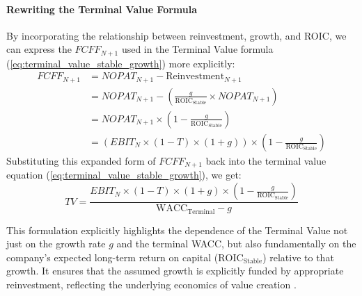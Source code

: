\paragraph{Rewriting the Terminal Value Formula}
By incorporating the relationship between reinvestment, growth, and ROIC, we can express the \(FCFF_{N+1}\) used in the Terminal Value formula (\ref{eq:terminal_value_stable_growth}) more explicitly:
\begin{align*}
    FCFF_{N+1} & = NOPAT_{N+1} - \text{Reinvestment}_{N+1}                                                                         \\
               & = NOPAT_{N+1} - \left( \frac{g}{\text{ROIC}_{\text{Stable}}} \times NOPAT_{N+1} \right)                           \\
               & = NOPAT_{N+1} \times \left( 1 - \frac{g}{\text{ROIC}_{\text{Stable}}} \right)                                     \\
               & = \left( EBIT_N \times (1-T) \times (1+g) \right) \times \left( 1 - \frac{g}{\text{ROIC}_{\text{Stable}}} \right)
\end{align*}
Substituting this expanded form of \(FCFF_{N+1}\) back into the terminal value equation (\ref{eq:terminal_value_stable_growth}), we get:
\begin{equation} \label{eq:terminal_value_expanded}
    TV = \frac{EBIT_N \times (1-T) \times (1+g) \times \left( 1 - \frac{g}{\text{ROIC}_{\text{Stable}}} \right)}{\text{WACC}_{\text{Terminal}} - g}
\end{equation}

This formulation explicitly highlights the dependence of the Terminal Value not just on the growth rate \(g\) and the terminal WACC, but also fundamentally on the company's expected long-term return on capital (\(\text{ROIC}_{\text{Stable}}\)) relative to that growth. It ensures that the assumed growth is explicitly funded by appropriate reinvestment, reflecting the underlying economics of value creation \parencite{damodaran2025investment}.

